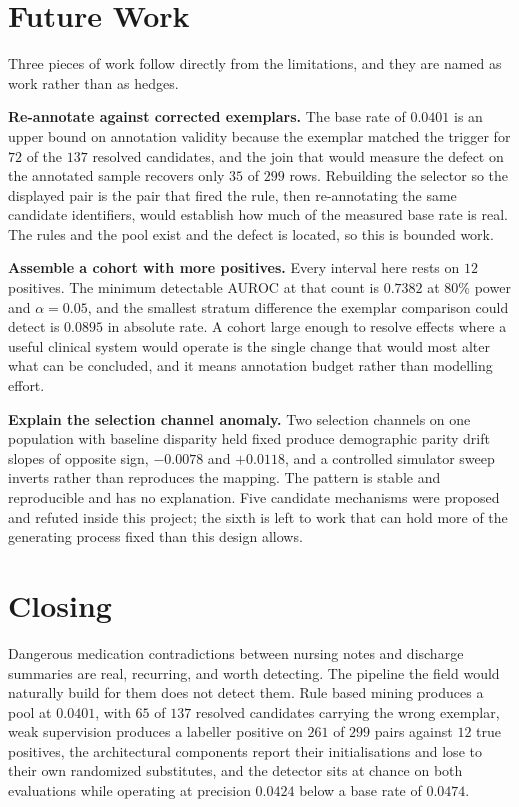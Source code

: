 \section{Future Work}
\label{sec:conc-future}

Three pieces of work follow directly from the limitations, and they are named as
work rather than as hedges.

\textbf{Re-annotate against corrected exemplars.} The base rate of $0.0401$ is
an upper bound on annotation validity because the exemplar matched the trigger
for $72$ of the $137$ resolved candidates, and the join that would measure the defect on the
annotated sample recovers only $35$ of $299$ rows. Rebuilding the selector so
the displayed pair is the pair that fired the rule, then re-annotating the same
candidate identifiers, would establish how much of the measured base rate is
real. The rules and the pool exist and the defect is located, so this is bounded
work.

\textbf{Assemble a cohort with more positives.} Every interval here rests on
$12$ positives. The minimum detectable AUROC at that count is $0.7382$ at
$80\%$ power and $\alpha = 0.05$, and the smallest stratum difference the
exemplar comparison could detect is $0.0895$ in absolute rate. A cohort large
enough to resolve effects where a useful clinical system would operate is the
single change that would most alter what can be concluded, and it means
annotation budget rather than modelling effort.

\textbf{Explain the selection channel anomaly.} Two selection channels on one
population with baseline disparity held fixed produce demographic parity drift
slopes of opposite sign, $-0.0078$ and $+0.0118$, and a controlled simulator
sweep inverts rather than reproduces the mapping. The pattern is stable and
reproducible and has no explanation. Five candidate mechanisms were proposed and
refuted inside this project; the sixth is left to work that can hold more of the
generating process fixed than this design allows.

\section{Closing}
\label{sec:conc-closing}

Dangerous medication contradictions between nursing notes and discharge
summaries are real, recurring, and worth detecting. The pipeline the field would
naturally build for them does not detect them. Rule based mining produces a pool
at $0.0401$, with $65$ of $137$ resolved candidates carrying the wrong exemplar,
weak supervision produces a labeller positive on $261$ of $299$ pairs against
$12$ true positives, the architectural components report their initialisations
and lose to their own randomized substitutes, and the detector sits at chance on
both evaluations while operating at precision $0.0424$ below a base rate of
$0.0474$.


